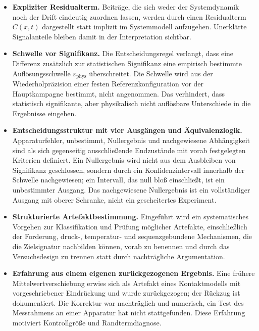 \documentclass[12pt,a4paper]{report}
\begin{document}
\begin{itemize}
  \item \textbf{Expliziter Residualterm.}
        Beiträge, die sich weder der Systemdynamik noch der Drift
        eindeutig zuordnen lassen, werden durch einen Residualterm
        $C(x,t)$ dargestellt statt implizit im Systemmodell
        aufzugehen. Unerklärte Signalanteile bleiben damit in der
        Interpretation sichtbar.

  \item \textbf{Schwelle vor Signifikanz.}
        Die Entscheidungsregel verlangt, dass eine Differenz zusätzlich
        zur statistischen Signifikanz eine empirisch bestimmte
        Auflösungsschwelle $\varepsilon_{\mathrm{phys}}$ überschreitet.
        Die Schwelle wird aus der Wiederholpräzision einer festen
        Referenzkonfiguration vor der Hauptkampagne bestimmt, nicht
        angenommen. Das verhindert, dass statistisch signifikante, aber
        physikalisch nicht auflösbare Unterschiede in die Ergebnisse
        eingehen.

  \item \textbf{Entscheidungsstruktur mit vier Ausgängen und
        Äquivalenzlogik.}
        Apparaturfehler, unbestimmt, Nullergebnis und nachgewiesene
        Abhängigkeit sind als sich gegenseitig ausschließende Endzustände
        mit vorab festgelegten Kriterien definiert. Ein Nullergebnis
        wird nicht aus dem Ausbleiben von Signifikanz geschlossen,
        sondern durch ein Konfidenzintervall innerhalb der Schwelle
        nachgewiesen; ein Intervall, das null bloß einschließt, ist ein
        unbestimmter Ausgang. Das nachgewiesene Nullergebnis ist ein
        vollständiger Ausgang mit oberer Schranke, nicht ein
        gescheitertes Experiment.

  \item \textbf{Strukturierte Artefaktbestimmung.}
        Eingeführt wird ein systematisches Vorgehen zur Klassifikation
        und Prüfung möglicher Artefakte, einschließlich der Forderung,
        druck-, temperatur- und sequenzgebundene Mechanismen, die die
        Zielsignatur nachbilden können, vorab zu benennen und durch das
        Versuchsdesign zu trennen statt durch nachträgliche Argumentation.

  \item \textbf{Erfahrung aus einem eigenen zurückgezogenen Ergebnis.}
        Eine frühere Mittelwertverschiebung erwies sich als Artefakt
        eines Kontaktmodells mit vorgeschriebener Eindrückung und wurde
        zurückgezogen; der Rückzug ist dokumentiert. Die Korrektur war
        nachträglich und numerisch, ein Test des Messrahmens an einer
        Apparatur hat nicht stattgefunden. Diese Erfahrung motiviert
        Kontrollgröße und Randtermdiagnose.

\end{itemize}
\end{document}
